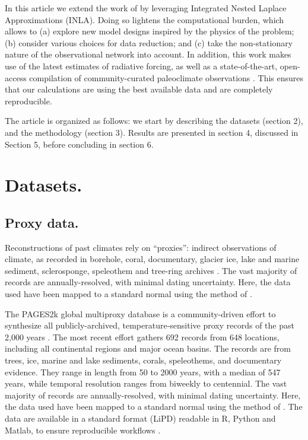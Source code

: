 \documentclass[12pt]{amsart}
\theoremstyle{plain}
\theoremstyle{definition}
\theoremstyle{remark}
\begin{document}
In this article we extend the work of \cite{Barboza2014} by  leveraging Integrated Nested Laplace
Approximations (INLA). Doing so lightens the computational burden, which allows to (a) explore new model designs inspired by the physics of the problem; (b) consider various choices for data reduction; and (c) take the non-stationary nature of the observational network into account.  In addition, this work makes use of the latest estimates of radiative forcing, as well as a state-of-the-art, open-access compilation of community-curated paleoclimate observations \citep{PAGES2kSD2017short}. This ensures that our calculations are using the best available data and are completely reproducible.  

The article is organized as follows: we start by describing the datasets (section 2), and the methodology (section 3). Results are presented in section 4, discussed in Section 5, before concluding in section 6. 

\section{Datasets.}
\label{sec:data}

\subsection{Proxy data.}
Reconstructions of past climates rely on ``proxies'': indirect observations of climate, as recorded in borehole, coral, documentary, glacier
ice, lake and marine sediment, sclerosponge, speleothem and tree-ring archives
\citep{Jones_Holocene09}. The vast majority of records are annually-resolved, with minimal dating uncertainty. Here, the data used have been mapped to a standard normal using the method of \citep{vanAlbada2007}.

The PAGES2k global multiproxy database is a community-driven effort to
synthesize all publicly-archived, temperature-sensitive proxy records of the
past 2,000 years \cite{PAGES2kSD2017short}. The most recent effort gathers 692 records from 648 locations, including all continental regions and major ocean basins. The records are from trees, ice, marine and lake sediments, corals, speleothems, and documentary evidence. They range in length from 50 to 2000 years, with a median of 547 years, while temporal resolution ranges from biweekly to centennial.
  The vast majority of records are annually-resolved, with minimal dating uncertainty. Here, the data used have been mapped to a standard normal using the method of \cite{vanAlbada2007}. The data are available in a standard format (LiPD) readable in R, Python and Matlab, to ensure reproducible workflows \cite{lipd_cp}.   
\end{document}
